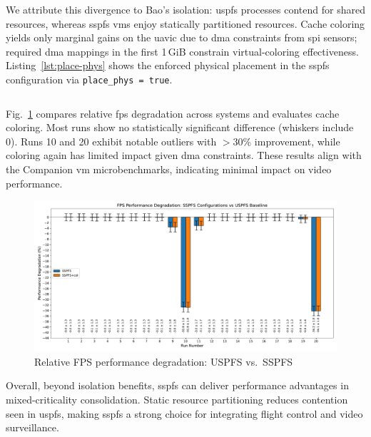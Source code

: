 We attribute this divergence to Bao’s isolation: \gls{uspfs} processes contend
for shared resources, whereas \gls{sspfs} \glspl{vm} enjoy statically
partitioned resources. Cache coloring yields only marginal gains on the
\gls{uavic} due to \gls{dma} constraints from \gls{spi} sensors; required
\gls{dma} mappings in the first 1\,GiB constrain virtual-coloring
effectiveness. Listing~\ref{lst:place-phys} shows the enforced physical
placement in the \gls{sspfs} configuration via \lstinline{place_phys = true}.

\begin{longlisting}
\centering
\inputminted[]{bash}{./listing/placePhys.c}
\caption[Physical memory mapping in the SSPFS system]{Physical memory mapping in \gls{sspfs}: \lstinline{place_phys = true}}
\label{lst:place-phys}
\end{longlisting}

Fig.~\ref{fig:cam-sspfs-uspfs} compares relative \gls{fps} degradation across
systems and evaluates cache coloring. Most runs show no statistically
significant difference (whiskers include 0). Runs 10 and 20 exhibit notable
outliers with \(>\)30\% improvement, while coloring again has limited impact
given \gls{dma} constraints. These results align with the Companion \gls{vm}
microbenchmarks, indicating minimal impact on video performance.

\begin{figure}[!hbt]
  \centering
  \includegraphics[width=1.0\textwidth]{./img/pdf/cam-sspfs-uspfs} 
  \caption{Relative FPS performance degradation: USPFS vs.\ SSPFS}%
  \label{fig:cam-sspfs-uspfs}
\end{figure}

Overall, beyond isolation benefits, \gls{sspfs} can deliver performance
advantages in mixed-criticality consolidation. Static resource partitioning
reduces contention seen in \gls{uspfs}, making \gls{sspfs} a strong choice for
integrating flight control and video surveillance.

